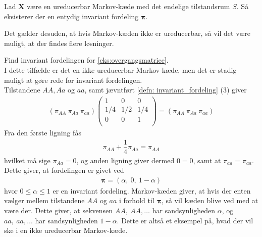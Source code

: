 \begin{minipage}\textwidth
\begin{pro} \textbf{} %
\newline
Lad $\bm X$ være en ureducerbar Markov-kæde med det endelige tilstandsrum $S$. Så eksisterer der en entydig invariant fordeling $\bm \pi$.
\end{pro}
\end{minipage}

Det gælder desuden, at hvis Markov-kæden ikke er ureducerbar, så vil det være muligt, at der findes flere løsninger.

\begin{eks} \textbf{} %
\newline Find invariant fordelingen for \autoref{eks:overgangsmatrice}.\\
I dette tilfælde er det en ikke ureducerbar Markov-kæde, men det er stadig muligt at gøre rede for invariant fordelingen.\\
Tilstandene $AA, Aa$ og $aa$, samt jævntført \autoref{defn: invariant_fordeling} (3)
giver\\
\begin{align*}
    (\pi_{AA} \ \pi_{Aa} \ \pi_{aa}) \begin{pmatrix}
    1 & 0 & 0 \\
    1/4 & 1/2 & 1/4 \\
    0 & 0 & 1 \\
    \end{pmatrix}
    = (\pi_{AA} \ \pi_{Aa} \ \pi_{aa})
\end{align*}
Fra den første ligning fås
\begin{align*}
    \pi_{AA} + \dfrac{1}{4}\pi_{Aa} = \pi_{AA}
\end{align*}
hvilket må sige $\pi_{Aa}=0$, og anden ligning giver dermed $0=0$, samt at $\pi_{aa}=\pi_{aa}$. Dette giver, at fordelingen er givet ved
\begin{align*}
    \bm \pi = (\alpha, \ 0,\ 1-\alpha)
\end{align*}
hvor $0 \leq \alpha \leq 1$ er en invariant fordeling. Markov-kæden giver, at hvis der enten vælger mellem tilstandene $AA$ og $aa$ i forhold til $\bm \pi$, så vil kæden blive ved med at være der. Dette giver, at sekvensen $AA, \ AA, \ldots$ har sandsynligheden $\alpha$, og $aa, \ aa, \dots$ har sandsynligheden $1-\alpha$. Dette er altså et eksempel på, hvad der vil ske i en ikke ureducerbar Markov-kæde.
\end{eks}